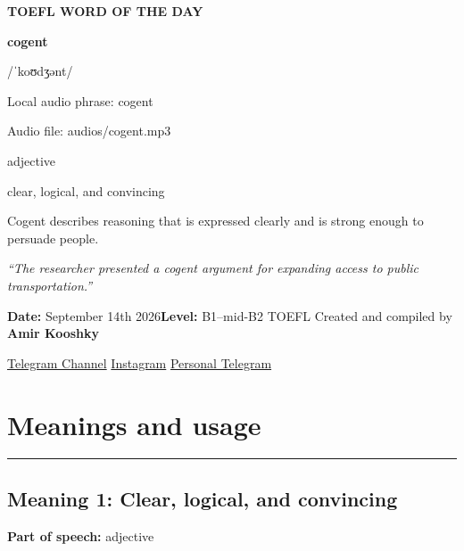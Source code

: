 \documentclass[11pt]{article}
\newcommand{\sectionrule}{\par\vspace{-0.5em}\noindent\textcolor{Accent}{\rule{\linewidth}{0.6pt}}\par}
\begin{document}
\begin{center}
{\sffamily\bfseries\color{Accent} TOEFL WORD OF THE DAY\par}
\vspace{8mm}
{\fontsize{42}{48}\selectfont\bfseries cogent\par}
\vspace{2mm}
{\Large\sffamily\color{Accent} /ˈkoʊdʒənt/\par}
\vspace{2mm}
{\small\sffamily Local audio phrase: cogent\par}
{\small\sffamily Audio file: audios/cogent.mp3\par}
\vspace{2mm}
{\large\sffamily\color{Muted} adjective\par}
\vspace{5mm}
{\sffamily clear, logical, and convincing\par}
\vspace{6mm}
{\large Cogent describes reasoning that is expressed clearly and is strong enough to persuade people.\par}
\vspace{6mm}
\begin{minipage}{0.84\textwidth}
\itshape “The researcher presented a cogent argument for expanding access to public transportation.”
\end{minipage}\par
\vspace{10mm}
\textbf{Date:} September 14th 2026\quad\textbullet\quad \textbf{Level:} B1--mid-B2 TOEFL
\vfill
Created and compiled by \textbf{Amir Kooshky}\par
\vspace{2mm}
\href{https://t.me/KooshkyTOEFL}{Telegram Channel}\quad\textbullet\quad
\href{https://www.instagram.com/kooshkytoefl}{Instagram}\quad\textbullet\quad
\href{https://t.me/KooshkyTOEFL\_pv}{Personal Telegram}
\end{center}
\newpage
\tableofcontents
\newpage

\section{Meanings and usage}
\sectionrule
\subsection{Meaning 1: Clear, logical, and convincing}
\textbf{Part of speech:} adjective
\end{document}
